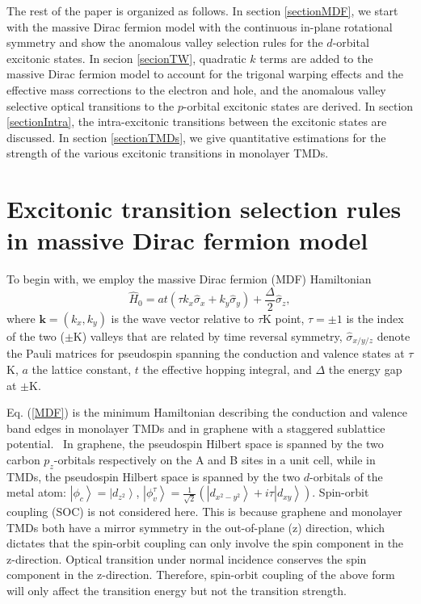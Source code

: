 \documentclass[prb,twocolumn,amsmath,amssymb,superscriptaddress,showpacs]{revtex4}
\begin{document}
The rest of the paper is organized as follows. In section \ref{sectionMDF}, we start with the massive Dirac fermion model with the continuous in-plane rotational symmetry and show the anomalous valley selection rules for the $d$-orbital excitonic states. In secion \ref{secionTW}, quadratic $k$ terms are added to the massive Dirac fermion model to account for the trigonal warping effects and the effective mass corrections to the electron and hole, and the anomalous valley selective optical transitions to the $p$-orbital excitonic states are derived. In section \ref{sectionIntra}, the intra-excitonic transitions between the excitonic states are discussed. In section \ref{sectionTMDs}, we give quantitative estimations for the strength of the various excitonic transitions in monolayer TMDs.

\section{Excitonic transition selection rules in massive Dirac fermion model \label{sectionMDF}}

To begin with, we employ the massive Dirac fermion (MDF) Hamiltonian
\begin{equation}
\hat{H}_0 = at(\tau  k_x\hat{\sigma}_x + k_y\hat{\sigma}_y) + \frac{\Delta}{2} \hat{\sigma}_z, \label{MDF}
\end{equation}
where $\mathbf{k}=(k_{x},k_{y})$ is the wave vector relative to $\tau$K point, $\tau = \pm 1$ is the index of the two ($\pm$K) valleys that are related by time reversal symmetry, $\hat{\sigma}_{x/y/z}$ denote the Pauli matrices for pseudospin spanning the conduction and valence states at $\tau$K, $a$ the lattice constant, $t$ the effective hopping integral, and $\Delta$ the energy gap at $\pm$K. 

Eq. (\ref{MDF}) is the minimum Hamiltonian describing the conduction and valence band edges in monolayer TMDs and in graphene with a staggered sublattice potential.~\cite{Xiao and Yao PRL07, Yao Coupled Spin Valley 2012}
In graphene, the pseudospin Hilbert space is spanned by the two carbon $p_z$-orbitals respectively on the A and B sites in a unit cell, while in TMDs, the pseudospin Hilbert space is spanned by the two $d$-orbitals of the metal atom: $\left|\phi_{c}\right\rangle =\left|d_{z^{2}}\right\rangle$,
$\left|\phi_{v}^{\tau}\right\rangle =\frac{1}{\sqrt{2}}(\left|d_{x^{2}-y^{2}}\right\rangle +i\tau\left|d_{xy}\right\rangle )$.
Spin-orbit coupling (SOC) is not considered here. This is because  graphene and monolayer TMDs both have a mirror symmetry in the out-of-plane (z) direction, which dictates that the spin-orbit coupling can only involve the spin component in the z-direction. Optical transition under normal incidence conserves the spin component in the z-direction. Therefore, spin-orbit coupling of the above form will only affect the transition energy but not the transition strength. 
\end{document}

